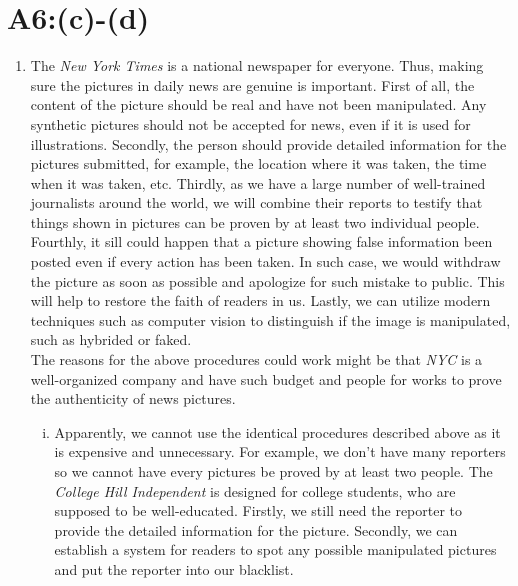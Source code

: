 \section*{A6:(c)-(d)}
\begin{enumerate}[label=\alph*., start=3]
\item The \emph{New York Times} is a national newspaper for everyone. Thus, making sure the pictures in daily news are genuine is important. First of all, the content of the picture should be real and have not been manipulated. Any synthetic pictures should not be accepted for news, even if it is used for illustrations. Secondly, the person should provide detailed information for the pictures submitted, for example, the location where it was taken, the time when it was taken, etc. Thirdly, as we have a large number of well-trained journalists around the world, we will combine their reports to testify that things shown in pictures can be proven by at least two individual people. Fourthly, it sill could happen that a picture showing false information been posted even if every action has been taken. In such case, we would withdraw the picture as soon as possible and apologize for such mistake to public. This will help to restore the faith of readers in us. Lastly, we can utilize modern techniques such as computer vision to distinguish if the image is manipulated, such as hybrided or faked. \\
The reasons for the above procedures could work might be that \emph{NYC} is a well-organized company and have such budget and people for works to prove the authenticity of news pictures.
\begin{enumerate}[(i)]
    \item Apparently, we cannot use the identical procedures described above as it is expensive and unnecessary. For example, we don't have many reporters so we cannot have every pictures be proved by at least two people. The \emph{College Hill Independent} is designed for college students, who are supposed to be well-educated. Firstly, we still need the reporter to provide the detailed information for the picture. Secondly, we can establish a system for readers to spot any possible manipulated pictures and put the reporter into our blacklist. 
\end{enumerate}


\end{enumerate}
